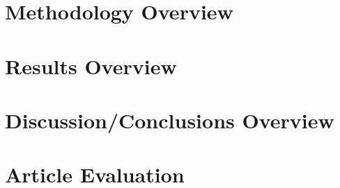 \documentclass[
10pt, %
letterpaper, %
twocolumn, %
landscape %
]{article}
\begin{document}

\section{Methodology Overview}




\section{Results Overview}




\section{Discussion/Conclusions Overview}




\section*{Article Evaluation}




\renewcommand{\refname}{Reference} %


\end{document}
